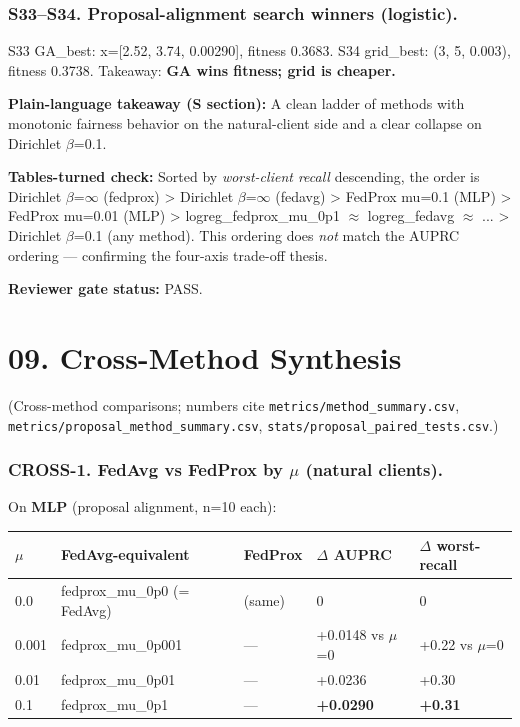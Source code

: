 \documentclass{article}
\begin{document}
\subsubsection{S33--S34. Proposal-alignment search winners (logistic).}

S33 GA\_best: x=[2.52, 3.74, 0.00290], fitness 0.3683. S34 grid\_best: (3, 5, 0.003), fitness 0.3738. Takeaway: \textbf{GA wins fitness; grid is cheaper.}


\textbf{Plain-language takeaway (S section):} A clean ladder of methods with monotonic fairness behavior on the natural-client side and a clear collapse on Dirichlet \ensuremath{\beta}=0.1.


\textbf{Tables-turned check:} Sorted by \emph{worst-client recall} descending, the order is Dirichlet \ensuremath{\beta}=\ensuremath{\infty} (fedprox) > Dirichlet \ensuremath{\beta}=\ensuremath{\infty} (fedavg) > FedProx mu=0.1 (MLP) > FedProx mu=0.01 (MLP) > logreg\_fedprox\_mu\_0p1 \ensuremath{\approx} logreg\_fedavg \ensuremath{\approx} ... > Dirichlet \ensuremath{\beta}=0.1 (any method). This ordering does \emph{not} match the AUPRC ordering --- confirming the four-axis trade-off thesis.


\textbf{Reviewer gate status:} PASS.



\clearpage
\section{09. Cross-Method Synthesis}


(Cross-method comparisons; numbers cite \texttt{metrics/method\_summary.csv}, \texttt{metrics/proposal\_method\_summary.csv}, \texttt{stats/proposal\_paired\_tests.csv}.)


\subsubsection{CROSS-1. FedAvg vs FedProx by \ensuremath{\mu} (natural clients).}


On \textbf{MLP} (proposal alignment, n=10 each):


\begin{table}[H]
  \centering
  \begin{tabular}{lllll}
    \toprule
    \ensuremath{\mu} & FedAvg-equivalent & FedProx & \ensuremath{\Delta} AUPRC & \ensuremath{\Delta} worst-recall \\
    \midrule
    0.0 & fedprox\_mu\_0p0 (= FedAvg) & (same) & 0 & 0 \\
    0.001 & fedprox\_mu\_0p001 & --- & +0.0148 vs \ensuremath{\mu}=0 & +0.22 vs \ensuremath{\mu}=0 \\
    0.01 & fedprox\_mu\_0p01 & --- & +0.0236 & +0.30 \\
    0.1 & fedprox\_mu\_0p1 & --- & \textbf{+0.0290} & \textbf{+0.31} \\
    \bottomrule
  \end{tabular}
\end{table}
\end{document}
